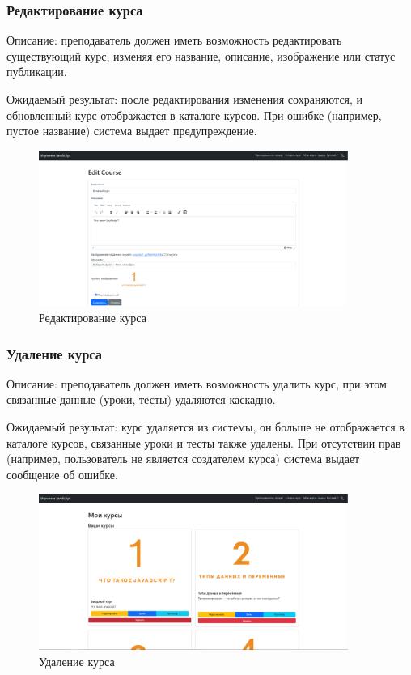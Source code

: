 \subsubsection{Редактирование курса}
	
Описание: преподаватель должен иметь возможность редактировать существующий курс, изменяя его название, описание, изображение или статус публикации.
	
Ожидаемый результат: после редактирования изменения сохраняются, и обновленный курс отображается в каталоге курсов. При ошибке (например, пустое название) система выдает предупреждение.
	
	\begin{figure}[ht]
		\centering
		\includegraphics[width=0.9\textwidth]{images/редактироватькурс} 
		\caption{Редактирование курса}
		\label{editcourse:image}
	\end{figure}
	
\subsubsection{Удаление курса}
	
Описание: преподаватель должен иметь возможность удалить курс, при этом связанные данные (уроки, тесты) удаляются каскадно.
	
Ожидаемый результат: курс удаляется из системы, он больше не отображается в каталоге курсов, связанные уроки и тесты также удалены. При отсутствии прав (например, пользователь не является создателем курса) система выдает сообщение об ошибке.
	
	\begin{figure}[ht]
		\centering
		\includegraphics[width=0.9\textwidth]{images/удалитькурс} 
		\caption{Удаление курса}
		\label{deletecourse:image}
	\end{figure}
	
